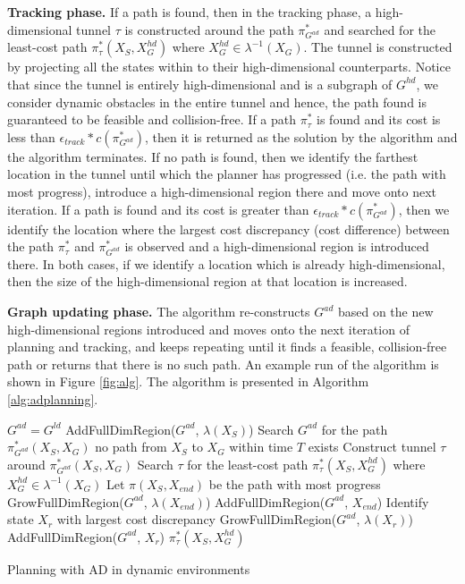 {\bf Tracking phase.} If a path is found, then in the tracking phase, a high-dimensional tunnel $\tau$ is constructed around the path $\pi_{G^{ad}}^*$ and searched for the least-cost path $\pi_\tau^*(X_S, X_G^{hd})$ where $X_G^{hd} \in \lambda^{-1}(X_G)$. The tunnel is constructed by projecting all the states within to their high-dimensional counterparts. Notice that since the tunnel is entirely high-dimensional and is a subgraph of $G^{hd}$, we consider dynamic obstacles in the entire tunnel and hence, the path found is guaranteed to be feasible and collision-free. If a path $\pi_\tau^*$ is found and its cost is less than $\epsilon_{track}*c(\pi_{G^{ad}}^*)$, then it is returned as the solution by the algorithm and the algorithm terminates. If no path is found, then we identify the farthest location in the tunnel until which the planner has progressed (i.e. the path with most progress), introduce a high-dimensional region there and move onto next iteration. If a path is found and its cost is greater than $\epsilon_{track}*c(\pi_{G^{ad}}^*)$, then we identify the location where the largest cost discrepancy (cost difference) between the path $\pi_\tau^*$ and $\pi_{G^{ad}}^*$ is observed and a high-dimensional region is introduced there. In both cases, if we identify a location which is already high-dimensional, then the size of the high-dimensional region at that location is increased.

{\bf Graph updating phase.} The algorithm re-constructs $G^{ad}$ based on the new high-dimensional regions introduced and moves onto the next iteration of planning and tracking, and keeps repeating until it finds a feasible, collision-free path or returns that there is no such path. An example run of the algorithm is shown in Figure \ref{fig:alg}. The algorithm is presented in Algorithm \ref{alg:adplanning}.


\begin{algorithm}[h]
\begin{algorithmic}[1]
\State $G^{ad} = G^{ld}$
\State AddFullDimRegion($G^{ad}$, $\lambda(X_S)$)
\Loop
\State Search $G^{ad}$ for the path $\pi_{G^{ad}}^*(X_S, X_G)$
\State \Return no path from $X_S$ to $X_G$ within time $T$ exists
\EndIf
\State Construct tunnel $\tau$ around $\pi_{G^{ad}}^*(X_S, X_G)$
\State Search $\tau$ for the least-cost path $\pi_{\tau}^*(X_S, X_G^{hd})$ where $X_G^{hd} \in \lambda^{-1}(X_G)$
\State Let $\pi(X_S, X_{end})$ be the path with most progress
\State GrowFullDimRegion($G^{ad}$, $\lambda(X_{end})$)
\Else
\State AddFullDimRegion($G^{ad}$, $X_{end}$)
\EndIf
{}
\State Identify state $X_r$ with largest cost discrepancy
\State GrowFullDimRegion($G^{ad}$, $\lambda(X_r)$)
\Else
\State AddFullDimRegion($G^{ad}$, $X_r$)
\EndIf
\Else
\State \Return $\pi_{\tau}^*(X_S, X_G^{hd})$
\EndIf
\EndLoop
\end{algorithmic}
\caption{Planning with AD in dynamic environments}
\label{alg:adplanning}
\end{algorithm}

